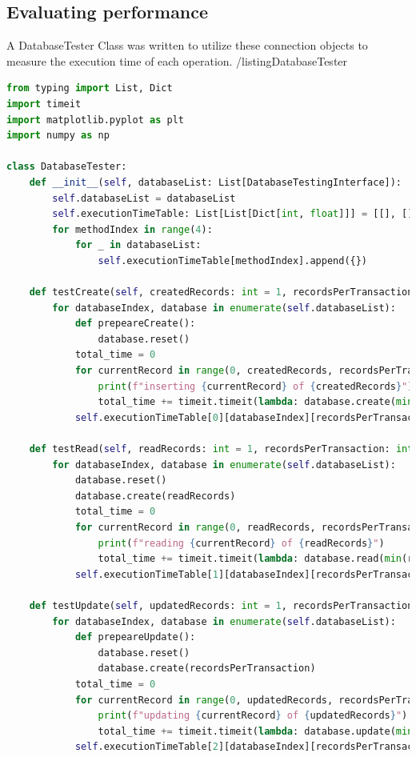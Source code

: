 \subsection{Evaluating performance}
\par A DatabaseTester Class was written to utilize these connection objects to measure the execution time of each operation. 
/listing{DatabaseTester}
\begin{lstlisting}[language=Python, caption=DatabaseTester]
from typing import List, Dict
import timeit
import matplotlib.pyplot as plt
import numpy as np

class DatabaseTester:
    def __init__(self, databaseList: List[DatabaseTestingInterface]):
        self.databaseList = databaseList
        self.executionTimeTable: List[List[Dict[int, float]]] = [[], [], [], []]
        for methodIndex in range(4):
            for _ in databaseList:
                self.executionTimeTable[methodIndex].append({})

    def testCreate(self, createdRecords: int = 1, recordsPerTransaction: int = 1):
        for databaseIndex, database in enumerate(self.databaseList):
            def prepeareCreate():
                database.reset()
            total_time = 0
            for currentRecord in range(0, createdRecords, recordsPerTransaction):
                print(f"inserting {currentRecord} of {createdRecords}")
                total_time += timeit.timeit(lambda: database.create(min(recordsPerTransaction, createdRecords - recordsPerTransaction)), lambda: prepeareCreate(), number=10)
            self.executionTimeTable[0][databaseIndex][recordsPerTransaction] = total_time

    def testRead(self, readRecords: int = 1, recordsPerTransaction: int = 1):
        for databaseIndex, database in enumerate(self.databaseList):
            database.reset()
            database.create(readRecords)
            total_time = 0
            for currentRecord in range(0, readRecords, recordsPerTransaction):
                print(f"reading {currentRecord} of {readRecords}")
                total_time += timeit.timeit(lambda: database.read(min(recordsPerTransaction, readRecords - recordsPerTransaction)), number=10)
            self.executionTimeTable[1][databaseIndex][recordsPerTransaction] = total_time

    def testUpdate(self, updatedRecords: int = 1, recordsPerTransaction: int = 1):
        for databaseIndex, database in enumerate(self.databaseList):
            def prepeareUpdate():
                database.reset()
                database.create(recordsPerTransaction)
            total_time = 0
            for currentRecord in range(0, updatedRecords, recordsPerTransaction):
                print(f"updating {currentRecord} of {updatedRecords}")
                total_time += timeit.timeit(lambda: database.update(min(recordsPerTransaction, updatedRecords - recordsPerTransaction)), lambda: prepeareUpdate(), number=10)
            self.executionTimeTable[2][databaseIndex][recordsPerTransaction] = total_time


\end{lstlisting}
